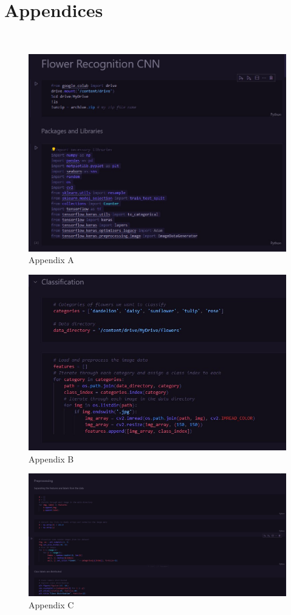 \chapter*{Appendices} \\ %

\begin{figure}[h]
    \centering
    \includegraphics[width=0.8\linewidth]{Cells 1 and 2.jpg}
    \caption{Appendix A}
    \label{fig:appendix_image_a}
\end{figure}

\begin{figure}[h]
    \centering
    \includegraphics[width=0.8\linewidth]{Cells 3 and 4.jpg}
    \caption{Appendix B}
    \label{fig:appendix_image}
\end{figure}

\begin{figure}[h]
    \centering
    \includegraphics[width=0.8\linewidth]{Cells image3.jpg}
    \caption{Appendix C}
    \label{fig:appendix_image}
\end{figure}



